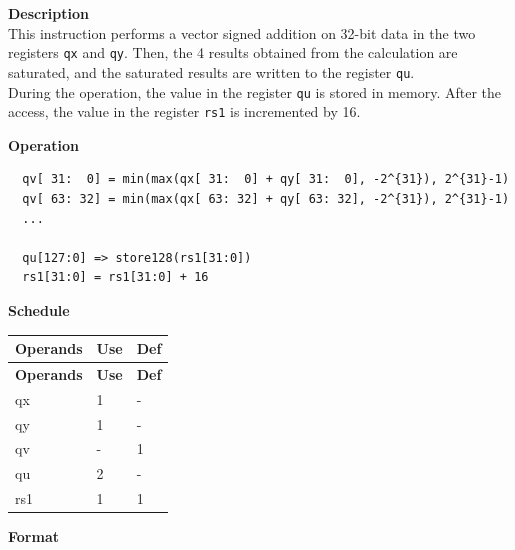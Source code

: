 \textbf{Description}\\
This instruction performs a vector signed addition on 32-bit data in the two registers \lstinline{qx} and \lstinline{qy}. Then, the 4 results obtained from the calculation are saturated, and the saturated results are written to the register \lstinline{qu}. \\ During the operation, the value in the register \lstinline{qu} is stored in memory. After the access, the value in the register \lstinline{rs1} is incremented by 16.

\textbf{Operation}\\
\begin{lstlisting}
  qv[ 31:  0] = min(max(qx[ 31:  0] + qy[ 31:  0], -2^{31}), 2^{31}-1)
  qv[ 63: 32] = min(max(qx[ 63: 32] + qy[ 63: 32], -2^{31}), 2^{31}-1)
  ...

  qu[127:0] => store128(rs1[31:0])
  rs1[31:0] = rs1[31:0] + 16
\end{lstlisting}


\textbf{Schedule}\\
\begin{longtable}[c]{|l|l|l|}
    \hline
    \rowcolor{lightgray}
    \textbf{Operands} & \textbf{Use} & \textbf{Def} \\\hline
    \endfirsthead
    \hline
    \rowcolor{lightgray}
     \textbf{Operands} & \textbf{Use} & \textbf{Def} \\\hline
    \endhead
    \hline
    \endfoot

    qx & 1 & - \\\hline
  qy & 1 & - \\\hline
     qv & - & 1 \\\hline
     qu & 2 & - \\\hline
     rs1 & 1 & 1

\end{longtable}

\textbf{Format}\\

